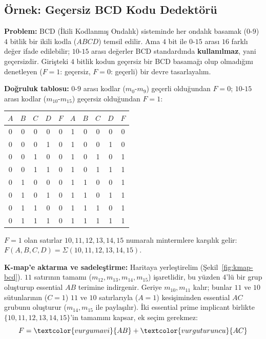 \subsection{Örnek: Geçersiz BCD Kodu Dedektörü}\label{sec:donanim-ornek-bcd}
\begin{ornek}\label{orn:bcd}
\textbf{Problem:} BCD (İkili Kodlanmış Ondalık) sisteminde her ondalık basamak ($0$-$9$)
$4$ bitlik bir ikili kodla ($ABCD$) temsil edilir. Ama $4$ bit ile $0$-$15$ arası $16$
farklı değer ifade edilebilir; $10$-$15$ arası değerler BCD standardında
\textbf{kullanılmaz}, yani geçersizdir. Girişteki $4$ bitlik kodun geçersiz bir BCD
basamağı olup olmadığını denetleyen ($F=1$: geçersiz, $F=0$: geçerli) bir devre
tasarlayalım.

\textbf{Doğruluk tablosu:} $0$-$9$ arası kodlar ($m_0$-$m_9$) geçerli olduğundan
$F=0$; $10$-$15$ arası kodlar ($m_{10}$-$m_{15}$) geçersiz olduğundan $F=1$:
\begin{center}
\begin{tabular}{cccc|c||cccc|c}
\toprule
$A$&$B$&$C$&$D$&$F$ & $A$&$B$&$C$&$D$&$F$\\
\midrule
0&0&0&0&0 & 1&0&0&0&0\\
0&0&0&1&0 & 1&0&0&1&0\\
0&0&1&0&0 & 1&0&1&0&1\\
0&0&1&1&0 & 1&0&1&1&1\\
0&1&0&0&0 & 1&1&0&0&1\\
0&1&0&1&0 & 1&1&0&1&1\\
0&1&1&0&0 & 1&1&1&0&1\\
0&1&1&1&0 & 1&1&1&1&1\\
\bottomrule
\end{tabular}
\end{center}
$F=1$ olan satırlar $10,11,12,13,14,15$ numaralı mintermlere karşılık gelir:
$F(A,B,C,D)=\Sigma(10,11,12,13,14,15)$.

\textbf{K-map'e aktarma ve sadeleştirme:} Haritaya yerleştirelim (Şekil~\ref{fig:kmap-bcd}).
$11$ satırının tamamı ($m_{12},m_{13},m_{14},m_{15}$) işaretlidir, bu yüzden $4$'lü bir
grup oluşturup essential $AB$ terimine indirgenir. Geriye $m_{10},m_{11}$ kalır; bunlar
$11$ ve $10$ sütunlarının ($C=1$) $11$ ve $10$ satırlarıyla ($A=1$) kesişiminden essential
$AC$ grubunu oluşturur ($m_{14},m_{15}$ ile paylaşılır). İki essential prime implicant
birlikte $\{10,11,12,13,14,15\}$'in tamamını kapsar, ek seçim gerekmez:
\[
F = \textcolor{vurgumavi}{AB} + \textcolor{vurguturuncu}{AC}
\]


\end{ornek}
